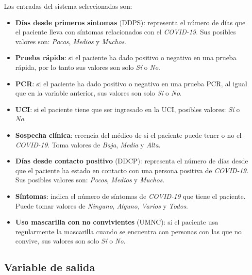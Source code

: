 \documentclass[12pt,a4paper, xcolor=table]{article}
\begin{document}
Las entradas del sistema seleccionadas son:

\begin{itemize}
  \item \textbf{Días desde primeros síntomas} (DDPS): representa el número de días que el paciente lleva con síntomas relacionados con el \textit{COVID-19}. Sus posibles valores son: \textit{Pocos}, \textit{Medios} y \textit{Muchos}.

  \item \textbf{Prueba rápida}: si el paciente ha dado positivo o negativo en una prueba rápida, por lo tanto sus valores son solo \textit{Sí} o \textit{No}.

  \item \textbf{PCR}: si el paciente ha dado positivo o negativo en una prueba PCR, al igual que en la variable anterior, sus valores son solo \textit{Sí} o \textit{No}.

  \item \textbf{UCI}: si el paciente tiene que ser ingresado en la UCI, posibles valores: \textit{Sí} o \textit{No}.

  \item \textbf{Sospecha clínica}: creencia del médico de si el paciente puede tener o no el \textit{COVID-19}. Toma valores de \textit{Baja}, \textit{Media} y \textit{Alta}.

  \item \textbf{Días desde contacto positivo} (DDCP): representa el número de días desde que el paciente ha estado en contacto con una persona positiva de \textit{COVID-19}. Sus posibles valores son: \textit{Pocos}, \textit{Medios} y \textit{Muchos}.

  \item \textbf{Síntomas}: indica el número de síntomas de \textit{COVID-19} que tiene el paciente. Puede tomar valores de \textit{Ninguno}, \textit{Alguno}, \textit{Varios} y \textit{Todos}.

  \item \textbf{Uso mascarilla con no convivientes} (UMNC): si el paciente usa regularmente la mascarilla cuando se encuentra con personas con las que no convive, sus valores son solo \textit{Sí} o \textit{No}.

\end{itemize}



\subsection{Variable de salida}
\end{document}
